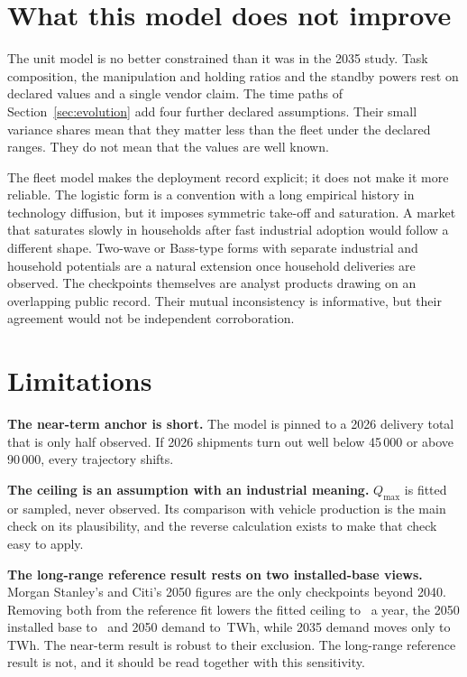 \documentclass[11pt]{article}
\newcommand{\TWh}{\,TWh}
\newcommand{\secref}[1]{Section~\ref{#1}}
\begin{document}
\section{What this model does not improve}\label{sec:notimproved}
The unit model is no better constrained than it was in the 2035 study. Task composition, the manipulation and holding ratios and the standby powers rest on declared values and a single vendor claim. The time paths of \secref{sec:evolution} add four further declared assumptions. Their small variance shares mean that they matter less than the fleet under the declared ranges. They do not mean that the values are well known.

The fleet model makes the deployment record explicit; it does not make it more reliable. The logistic form is a convention with a long empirical history in technology diffusion, but it imposes symmetric take-off and saturation. A market that saturates slowly in households after fast industrial adoption would follow a different shape. Two-wave or Bass-type forms with separate industrial and household potentials are a natural extension once household deliveries are observed. The checkpoints themselves are analyst products drawing on an overlapping public record. Their mutual inconsistency is informative, but their agreement would not be independent corroboration.

\section{Limitations}\label{sec:limits}
\textbf{The near-term anchor is short.} The model is pinned to a 2026 delivery total that is only half observed. If 2026 shipments turn out well below 45\,000 or above 90\,000, every trajectory shifts.

\textbf{The ceiling is an assumption with an industrial meaning.} $Q_{\max}$ is fitted or sampled, never observed. Its comparison with vehicle production is the main check on its plausibility, and the reverse calculation exists to make that check easy to apply.

\textbf{The long-range reference result rests on two installed-base views.} Morgan Stanley's and Citi's 2050 figures are the only checkpoints beyond 2040. Removing both from the reference fit lowers the fitted ceiling to \NoSecQmax\ a year, the 2050 installed base to \NoSecStock\ and 2050 demand to \NoSecTWh\TWh, while 2035 demand moves only to \NoSecTWhThirtyFive\TWh. The near-term result is robust to their exclusion. The long-range reference result is not, and it should be read together with this sensitivity.
\end{document}

